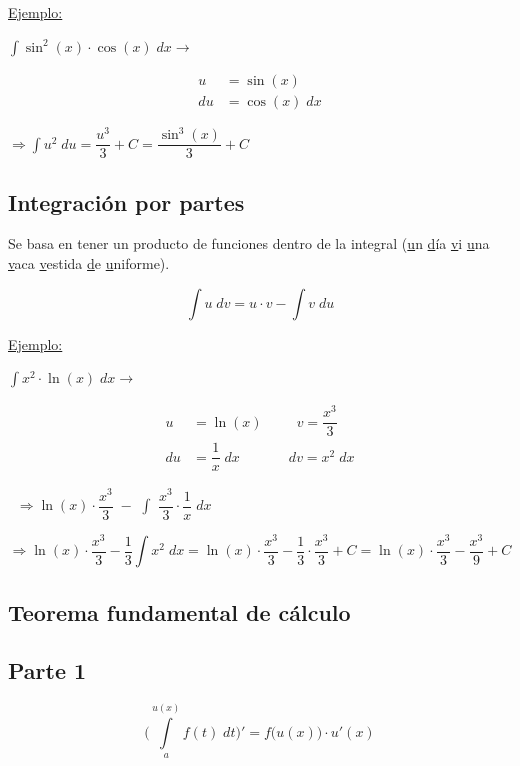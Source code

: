 \underline{Ejemplo:}

\hfil
$\int \sin^2(x) \cdot \cos(x) \;dx\longrightarrow$
\begin{minipage}[c]{0.15\textwidth}
\begin{align*}
    u &= \sin(x)\\
    du &= \cos(x) \;dx
\end{align*}    
\end{minipage}
$\Longrightarrow \int u^2\;du = \dfrac{u^3}{3} + C= \dfrac{\sin^3(x)}{3} + C$
\hfil


\subsection*{Integración por partes}

Se basa en tener un producto de funciones dentro de la integral (\underline{u}n \underline{d}ía \underline{v}i \underline{u}na \underline{v}aca \underline{v}estida \underline{d}e \underline{u}niforme).

$$\int u \;dv = u\cdot v - \int v\;du$$

\skipline 

\underline{Ejemplo:}

\hfil
$\int x^2 \cdot \ln(x)\;dx \longrightarrow$
\begin{minipage}[c]{0.25\textwidth}
\begin{align*}
    u &= \ln(x) &&\;\;\;v= \dfrac{x^3}{3}\\
    du &= \dfrac{1}{x} \;dx &&\;dv = x^2 \;dx
\end{align*}    
\end{minipage}
$\;\;\Longrightarrow \ln(x) \cdot \dfrac{x^3}{3} \;- $ {\Large$\int$ }$ \dfrac{x^3}{3}\cdot \dfrac{1}{x}\;dx $
\hfil
\skipline

$$\Longrightarrow \ln(x)\cdot \dfrac{x^3}{3} - \dfrac{1}{3}\int x^2\;dx = \ln(x)\cdot \dfrac{x^3}{3} - \dfrac{1}{3} \cdot \dfrac{x^3}{3} + C=
\ln(x)\cdot \dfrac{x^3}{3} - \dfrac{x^3}{9} + C$$


\newpage
\subsection*{Teorema fundamental de cálculo}


\subsection*{Parte 1}

$$\Big(\int\limits^{u(x)}_a f(t)\;dt\Big)' = 
f\big(u(x)\big) \cdot u'(x)$$



